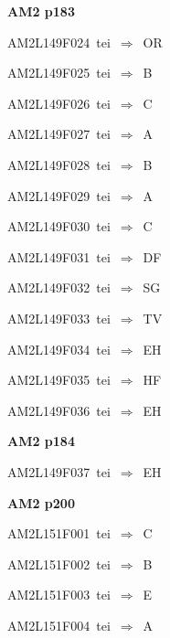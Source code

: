 \par\vfill\eject
{\bf\hfill AM2 p183\hfill\hbox{}}\par\bigskip
{\sixrm AM2L149F024\ {\sixit tei}\ }$\Rightarrow$\ OR\par\smallskip
{\sixrm AM2L149F025\ {\sixit tei}\ }$\Rightarrow$\ B\par\smallskip
{\sixrm AM2L149F026\ {\sixit tei}\ }$\Rightarrow$\ C\par\smallskip
{\sixrm AM2L149F027\ {\sixit tei}\ }$\Rightarrow$\ A\par\smallskip
{\sixrm AM2L149F028\ {\sixit tei}\ }$\Rightarrow$\ B\par\smallskip
{\sixrm AM2L149F029\ {\sixit tei}\ }$\Rightarrow$\ A\par\smallskip
{\sixrm AM2L149F030\ {\sixit tei}\ }$\Rightarrow$\ C\par\smallskip
{\sixrm AM2L149F031\ {\sixit tei}\ }$\Rightarrow$\ DF\par\smallskip
{\sixrm AM2L149F032\ {\sixit tei}\ }$\Rightarrow$\ SG\par\smallskip
{\sixrm AM2L149F033\ {\sixit tei}\ }$\Rightarrow$\ TV\par\smallskip
{\sixrm AM2L149F034\ {\sixit tei}\ }$\Rightarrow$\ EH\par\smallskip
{\sixrm AM2L149F035\ {\sixit tei}\ }$\Rightarrow$\ HF\par\smallskip
{\sixrm AM2L149F036\ {\sixit tei}\ }$\Rightarrow$\ EH\par\smallskip

\par\vfill\eject
{\bf\hfill AM2 p184\hfill\hbox{}}\par\bigskip
{\sixrm AM2L149F037\ {\sixit tei}\ }$\Rightarrow$\ EH\par\smallskip

\par\vfill\eject
{\bf\hfill AM2 p200\hfill\hbox{}}\par\bigskip
{\sixrm AM2L151F001\ {\sixit tei}\ }$\Rightarrow$\ C\par\smallskip
{\sixrm AM2L151F002\ {\sixit tei}\ }$\Rightarrow$\ B\par\smallskip
{\sixrm AM2L151F003\ {\sixit tei}\ }$\Rightarrow$\ E\par\smallskip
{\sixrm AM2L151F004\ {\sixit tei}\ }$\Rightarrow$\ A\par\smallskip

